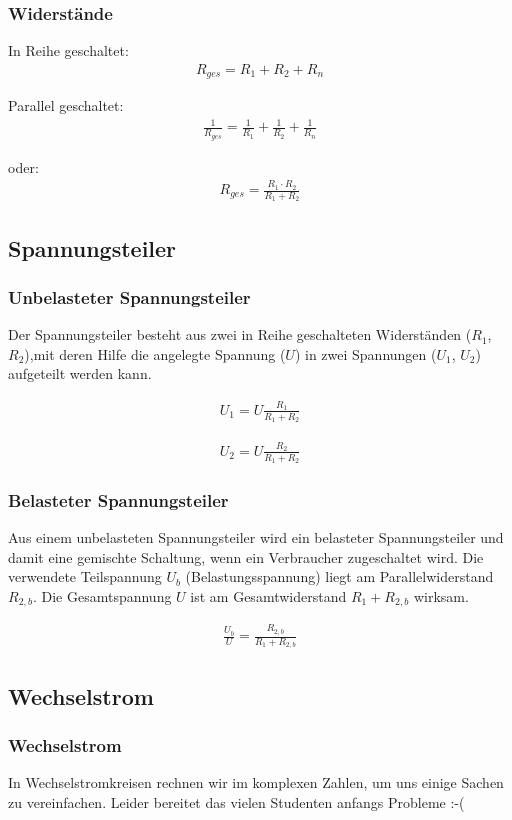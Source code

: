 \documentclass[german,ignorenonframetext]{beamer} %
\begin{document}
\begin{frame}
\frametitle{Widerstände}
In Reihe geschaltet:
\begin{eqnarray}
R_{ges} = R_{1} + R_{2} + R_{n}
\end{eqnarray}

Parallel geschaltet:
\begin{eqnarray}
\frac{1}{R_{ges}} = \frac{1}{R_{1}} + \frac{1}{R_{2}} + \frac{1}{R_{n}}
\end{eqnarray}

oder:
\begin{eqnarray}
R_{ges} = \frac{R_{1} \cdot R_{2}}{R_{1} + R_{2}}
\end{eqnarray}

\end{frame}

\subsection{Spannungsteiler}
\begin{frame}
\frametitle{Unbelasteter Spannungsteiler}
Der Spannungsteiler besteht aus zwei in Reihe geschalteten Widerständen ($R_{1}$, $R_{2}$),mit 
deren Hilfe die angelegte Spannung ($U$) in zwei Spannungen ($U_{1}$, $U_{2}$) aufgeteilt werden kann.

\begin{eqnarray}
U_{1} = U \frac{R_{1}}{R_{1} + R_{2}}
\end{eqnarray}

\begin{eqnarray}
U_{2} = U \frac{R_{2}}{R_{1} + R_{2}}
\end{eqnarray}
\end{frame}

\begin{frame}
\frametitle{Belasteter Spannungsteiler}
Aus einem unbelasteten Spannungsteiler wird ein belasteter Spannungsteiler und damit eine gemischte
Schaltung, wenn ein Verbraucher zugeschaltet wird.
Die verwendete Teilspannung $U_{b}$ (Belastungsspannung) liegt am Parallelwiderstand $R_{2,b}$.
Die Gesamtspannung $U$ ist am Gesamtwiderstand $R_{1} + R_{2,b}$ wirksam.

\begin{eqnarray}
\frac{U_{b}}{U} = \frac{R_{2,b}}{R_{1} + R_{2,b}}
\end{eqnarray}
\end{frame}


\subsection{Wechselstrom}
\begin{frame}
\frametitle{Wechselstrom}
In Wechselstromkreisen rechnen wir im komplexen Zahlen, um uns einige Sachen zu vereinfachen. Leider bereitet das vielen Studenten
anfangs Probleme :-(
\end{frame}
\end{document}
